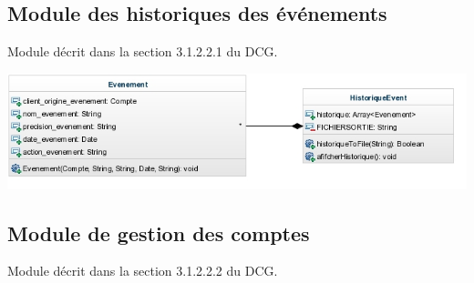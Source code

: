 \documentclass[10pt,a4paper]{report}
\begin{document}
\subsection{Module des historiques des événements}
Module décrit dans la section 3.1.2.2.1 du DCG.
\begin{center}
	\includegraphics{./Ressources/historiqueEvenement.jpeg}\\
\end{center}

\subsection{Module de gestion des comptes}
Module décrit dans la section 3.1.2.2.2 du DCG.
\begin{center}
	\\
\end{center}
\end{document}
